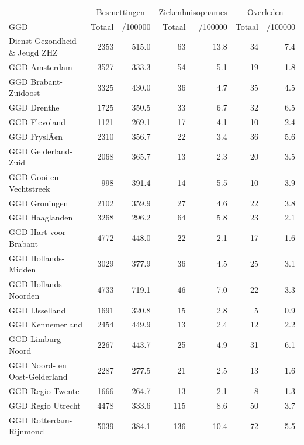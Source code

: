 \documentclass[
  english,
  man,floatsintext]{apa6}
\begin{document}
\begin{table}
\centering\begingroup\fontsize{10}{12}\selectfont

\begin{threeparttable}
\begin{tabular}{lrrrrrr}
\toprule
\multicolumn{1}{c}{ } & \multicolumn{2}{c}{Besmettingen} & \multicolumn{2}{c}{Ziekenhuisopnames} & \multicolumn{2}{c}{Overleden} \\
\cmidrule(l{3pt}r{3pt}){2-3} \cmidrule(l{3pt}r{3pt}){4-5} \cmidrule(l{3pt}r{3pt}){6-7}
GGD & Totaal & /100000 & Totaal & /100000 & Totaal & /100000\\
\midrule
Dienst Gezondheid \& Jeugd ZHZ & 2353 & 515.0 & 63 & 13.8 & 34 & 7.4\\
GGD Amsterdam & 3527 & 333.3 & 54 & 5.1 & 19 & 1.8\\
GGD Brabant-Zuidoost & 3325 & 430.0 & 36 & 4.7 & 35 & 4.5\\
GGD Drenthe & 1725 & 350.5 & 33 & 6.7 & 32 & 6.5\\
GGD Flevoland & 1121 & 269.1 & 17 & 4.1 & 10 & 2.4\\
GGD FryslÃ¢n & 2310 & 356.7 & 22 & 3.4 & 36 & 5.6\\
GGD Gelderland-Zuid & 2068 & 365.7 & 13 & 2.3 & 20 & 3.5\\
GGD Gooi en Vechtstreek & 998 & 391.4 & 14 & 5.5 & 10 & 3.9\\
GGD Groningen & 2102 & 359.9 & 27 & 4.6 & 22 & 3.8\\
GGD Haaglanden & 3268 & 296.2 & 64 & 5.8 & 23 & 2.1\\
GGD Hart voor Brabant & 4772 & 448.0 & 22 & 2.1 & 17 & 1.6\\
GGD Hollands-Midden & 3029 & 377.9 & 36 & 4.5 & 25 & 3.1\\
GGD Hollands-Noorden & 4733 & 719.1 & 46 & 7.0 & 22 & 3.3\\
GGD IJsselland & 1691 & 320.8 & 15 & 2.8 & 5 & 0.9\\
GGD Kennemerland & 2454 & 449.9 & 13 & 2.4 & 12 & 2.2\\
GGD Limburg-Noord & 2267 & 443.7 & 25 & 4.9 & 31 & 6.1\\
GGD Noord- en Oost-Gelderland & 2287 & 277.5 & 21 & 2.5 & 13 & 1.6\\
GGD Regio Twente & 1666 & 264.7 & 13 & 2.1 & 8 & 1.3\\
GGD Regio Utrecht & 4478 & 333.6 & 115 & 8.6 & 50 & 3.7\\
GGD Rotterdam-Rijnmond & 5039 & 384.1 & 136 & 10.4 & 72 & 5.5\\

\end{tabular}
\end{threeparttable}
\end{table}
\end{document}
